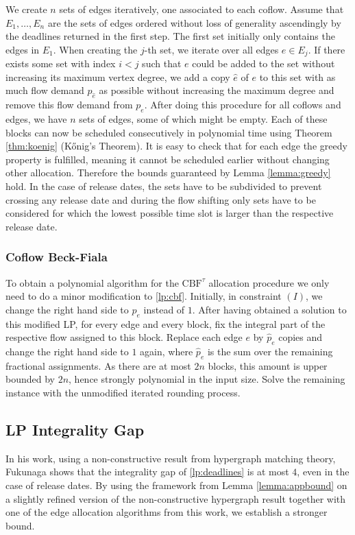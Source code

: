 \documentclass[11pt]{article}
\begin{document}
We create $n$ sets of edges iteratively, one associated to each coflow. Assume that $E_1,\dotsc,E_n$ are the sets of edges ordered without loss of generality ascendingly by the deadlines returned in the first step. The first set initially only contains the edges in $E_1$. When creating the $j$-th set, we iterate over all edges $e \in E_j$. If there exists some set with index $i < j$ such that $e$ could be added to the set without increasing its maximum vertex degree, we add a copy $\hat{e}$ of $e$ to this set with as much flow demand $p_{\hat{e}}$ as possible without increasing the maximum degree and remove this flow demand from $p_e$. After doing this procedure for all coflows and edges, we have $n$ sets of edges, some of which might be empty. Each of these blocks can now be scheduled consecutively in polynomial time using Theorem \ref{thm:koenig} (Kőnig's Theorem). It is easy to check that for each edge the greedy property is fulfilled, meaning it cannot be scheduled earlier without changing other allocation. Therefore the bounds guaranteed by Lemma \ref{lemma:greedy} hold. In the case of release dates, the sets have to be subdivided to prevent crossing any release date and during the flow shifting only sets have to be considered for which the lowest possible time slot is larger than the respective release date.

\subsubsection*{Coflow Beck-Fiala}

To obtain a polynomial algorithm for the $\mathrm{CBF}^\tau$ allocation procedure we only need to do a minor modification to \ref{lp:cbf}. Initially, in constraint $(I)$, we change the right hand side to $p_e$ instead of $1$. After having obtained a solution to this modified LP, for every edge and every block, fix the integral part of the respective flow assigned to this block. Replace each edge $e$ by $\hat{p}_e$ copies and change the right hand side to $1$ again, where $\hat{p}_e$ is the sum over the remaining fractional assignments. As there are at most $2n$ blocks, this amount is upper bounded by $2n$, hence strongly polynomial in the input size. Solve the remaining instance with the unmodified iterated rounding process.

\subsection{LP Integrality Gap}\label{sec:app:lpintgap}
In his work, using a non-constructive result from hypergraph matching theory, Fukunaga \cite{fukunaga22} shows that the integrality gap of \ref{lp:deadlines} is at most $4$, even in the case of release dates. By using the framework from Lemma \ref{lemma:appbound} on a slightly refined version of the non-constructive hypergraph result together with one of the edge allocation algorithms from this work, we establish a stronger bound.
\end{document}
